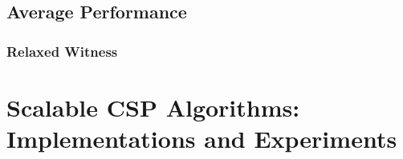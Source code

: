 \documentclass[screen,sigconf,anonymous,review]{acmart}
\begin{document}
\subsection{Average Performance}
\label{sec:avg_hd}

\subsubsection{Relaxed Witness}
\label{sec:relaxed_witness}


\section{Scalable CSP Algorithms:\texorpdfstring{\\}{ } Implementations and Experiments}
\label{sec:numeric}





\clearpage

 

%
%
%
%
%
%
%
%
\end{document}
